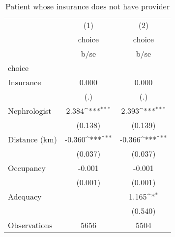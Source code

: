 \begin{table}[htbp]\centering
\def\sym#1{\ifmmode^{#1}\else\(^{#1}\)\fi}
\caption{Patient whose insurance does not have provider}
\begin{tabular}{l*{2}{c}}
\hline\hline
                    &\multicolumn{1}{c}{(1)}&\multicolumn{1}{c}{(2)}\\
                    &\multicolumn{1}{c}{choice}&\multicolumn{1}{c}{choice}\\
                    &        b/se         &        b/se         \\
\hline
choice              &                     &                     \\
Insurance           &       0.000         &       0.000         \\
                    &         (.)         &         (.)         \\
Nephrologist        &       2.384\sym{***}&       2.393\sym{***}\\
                    &     (0.138)         &     (0.139)         \\
Distance (km)       &      -0.360\sym{***}&      -0.366\sym{***}\\
                    &     (0.037)         &     (0.037)         \\
Occupancy           &      -0.001         &      -0.001         \\
                    &     (0.001)         &     (0.001)         \\
Adequacy            &                     &       1.165\sym{*}  \\
                    &                     &     (0.540)         \\
\hline
Observations        &        5656         &        5504         \\
\hline\hline
\end{tabular}
\end{table}
